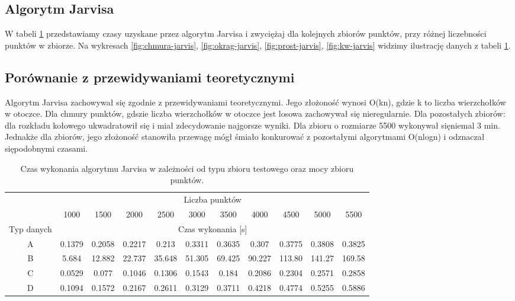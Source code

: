 \documentclass[11pt]{article}
\theoremstyle{remark} \newtheorem{definition}{def.}
\theoremstyle{definition} \newtheorem{twierdzenie}{tw.}
\begin{document}
\subsection{Algorytm Jarvisa}

W tabeli \ref{tab:jarvis} przedstawiamy czasy uzyskane przez algorytm Jarvisa i zwyciężaj dla kolejnych zbiorów punktów, przy różnej liczebności punktów w zbiorze. Na wykresach \ref{fig:chmura-jarvis}, 
\ref{fig:okrag-jarvis}, \ref{fig:prost-jarvis}, \ref{fig:kw-jarvis} widzimy ilustrację danych z tabeli \ref{tab:jarvis}.

\subsection{Porównanie z przewidywaniami teoretycznymi}
Algorytm Jarvisa zachowywał się zgodnie z przewidywaniami teoretycznymi. Jego złożoność wynosi O(kn), gdzie k to liczba wierzchołków w otoczce.
Dla chmury punktów, gdszie liczba wierzchołków w otoczce jest losowa zachowywał się nieregularnie. Dla pozostałych zbiorów: dla rozkładu kołowego
ukwadratowił się i miał zdecydowanie najgorsze wyniki. Dla zbioru o rozmiarze 5500 wykonywał sięniemal 3 min. Jednakże dla zbiorów, jego złożoność stanowiła
przewagę mógł śmiało konkurować z pozostałymi algorytmami O(nlogn) i odznaczał siępodobnymi czasami.

\begin{table}[]
\centering
\caption{Czas wykonania algorytmu Jarvisa w zależności od typu zbioru testowego oraz mocy zbioru punktów.}
\label{tab:jarvis}
\begin{tabular}{c|c|c|c|c|c|c|c|c|c|c|}
\cline{2-11}
\multicolumn{1}{l|}{} & \multicolumn{10}{c|}{Liczba punktów} \\ \cline{2-11} 
\multicolumn{1}{l|}{} & 1000 & 1500 & 2000 & 2500 & 3000 & 3500 & 4000 & 4500 & 5000 & 5500 \\ \hline
\multicolumn{1}{|c|}{Typ danych} & \multicolumn{10}{c|}{Czas wykonania {[}s{]}} \\ \hline
\multicolumn{1}{|c|}{A} & 0.1379 & 0.2058 & 0.2217 & 0.213 & 0.3311 & 0.3635 & 0.307 & 0.3775 & 0.3808 & 0.3825 \\ \hline
\multicolumn{1}{|c|}{B} & 5.684 & 12.882 & 22.737 & 35.648 & 51.305 & 69.425 & 90.227 & 113.80 & 141.27 & 169.58 \\ \hline
\multicolumn{1}{|c|}{C} & 0.0529 & 0.077 & 0.1046 & 0.1306 & 0.1543 & 0.184 & 0.2086 & 0.2304 & 0.2571 & 0.2858 \\ \hline
\multicolumn{1}{|c|}{D} & 0.1094 & 0.1572 & 0.2167 & 0.2611 & 0.3129 & 0.3711 & 0.4218 & 0.4774 & 0.5255 & 0.5886 \\ \hline
\end{tabular}
\end{table}
\end{document}
